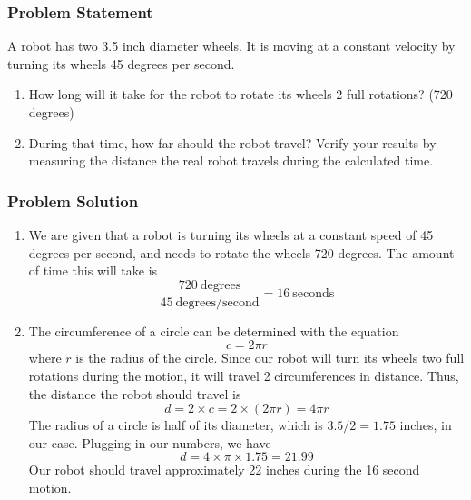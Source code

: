 \documentclass{article}
\begin{document}
\subsubsection{Problem Statement}
A robot has two 3.5 inch diameter wheels. It is moving at a constant velocity
by turning its wheels 45 degrees per second. 
\begin{enumerate}
\item How long will it take for the robot to rotate its wheels 2 full rotations? (720 degrees)
\item During that time, how far should the robot travel? Verify your results by measuring
the distance the real robot travels during the calculated time.
\end{enumerate}

\subsubsection{Problem Solution}
\begin{enumerate}
\item We are given that a robot is turning its wheels at a constant speed of 45 degrees per second, and 
needs to rotate the wheels 720 degrees. The amount of time this will take is
\begin{equation*}
\frac{720 ~\mathrm{degrees}}{45 ~\mathrm{degrees/second}} = 16 ~\mathrm{seconds}
\end{equation*}

\item The circumference of a circle can be determined with the equation
\begin{equation*}
c = 2 \pi r
\end{equation*} where $r$ is the radius of the circle. Since our robot will
turn its wheels two full rotations during the motion, it will travel 2 circumferences
in distance. Thus, the distance the robot should travel is
\begin{equation*}
d = 2 \times c = 2 \times (2 \pi r) = 4 \pi r
\end{equation*}
The radius of a circle is half of its diameter, which is $3.5 / 2 = 1.75$ inches, 
in our case. Plugging in our numbers, we have
\begin{equation*}
d = 4 \times \pi \times 1.75 = 21.99
\end{equation*}
Our robot should travel approximately 22 inches during the 16 second motion.
\end{enumerate}
\end{document}
